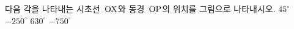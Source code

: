 다음 각을 나타내는 시초선~$\mathrm{OX}$와 동경~$\mathrm{OP}$의 위치를 그림으로 나타내시오.
 $45^\circ$
 $-250^\circ$
 $630^\circ$
 $-750^\circ$
